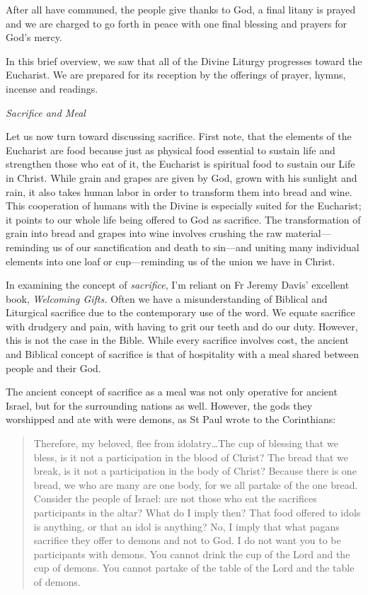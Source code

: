 \documentclass[
]{article}
\begin{document}
After all have communed, the people give thanks to God, a final litany
is prayed and we are charged to go forth in peace with one final
blessing and prayers for God's mercy.

In this brief overview, we saw that all of the Divine Liturgy progresses
toward the Eucharist. We are prepared for its reception by the offerings
of prayer, hymns, incense and readings.

\emph{Sacrifice and Meal}

Let us now turn toward discussing sacrifice. First note, that the
elements of the Eucharist are food because just as physical food
essential to sustain life and strengthen those who eat of it, the
Eucharist is spiritual food to sustain our Life in Christ. While grain
and grapes are given by God, grown with his sunlight and rain, it also
takes human labor in order to transform them into bread and wine. This
cooperation of humans with the Divine is especially suited for the
Eucharist; it points to our whole life being offered to God as
sacrifice. The transformation of grain into bread and grapes into wine
involves crushing the raw material---reminding us of our sanctification
and death to sin---and uniting many individual elements into one loaf or
cup---reminding us of the union we have in Christ.

In examining the concept of \emph{sacrifice}, I'm reliant on Fr Jeremy
Davis' excellent book, \emph{Welcoming Gifts.} Often we have a
misunderstanding of Biblical and Liturgical sacrifice due to the
contemporary use of the word. We equate sacrifice with drudgery and
pain, with having to grit our teeth and do our duty. However, this is
not the case in the Bible. While every sacrifice involves cost, the
ancient and Biblical concept of sacrifice is that of hospitality with a
meal shared between people and their God.

The ancient concept of sacrifice as a meal was not only operative for
ancient Israel, but for the surrounding nations as well. However, the
gods they worshipped and ate with were demons, as St Paul wrote to the
Corinthians:

\begin{quote}
Therefore, my beloved, flee from idolatry\ldots The cup of blessing that
we bless, is it not a participation in the blood of Christ? The bread
that we break, is it not a participation in the body of Christ? Because
there is one bread, we who are many are one body, for we all partake of
the one bread. Consider the people of Israel: are not those who eat the
sacrifices participants in the altar? What do I imply then? That food
offered to idols is anything, or that an idol is anything? No, I imply
that what pagans sacrifice they offer to demons and not to God. I do not
want you to be participants with demons. You cannot drink the cup of the
Lord and the cup of demons. You cannot partake of the table of the Lord
and the table of demons.
\end{quote}
\end{document}
